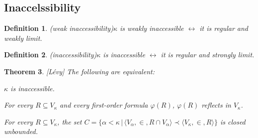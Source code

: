 \documentclass[12pt,a4paper]{article}
\newtheorem{theorem}{Theorem}[section]
\newtheorem{definition}[theorem]{Definition}
\newcommand{\set}[2]{\ensuremath{\{#1 \,|\, #2 \}}}
\renewcommand{\iff}{\leftrightarrow}
\newcommand{\el}{\prec}
\newcommand{\sub}{\subseteq}
\newcommand{\bce}{\begin{compactenum}}
\newcommand{\ece}{\end{compactenum}}
\begin{document}
\subsection{Inaccelssibility}
\begin{definition}(weak inaccessibility)\label{def:weakly_inaccessible}
$\kappa$ is \emph{weakly inaccessible} $\iff$ it is \emph{regular} and \emph{ weakly limit}.
\end{definition}
\begin{definition}(inaccessibility)\label{def:inaccessible}
$\kappa$ is \emph{inaccessible} $\iff$ it is \emph{regular} and \emph{strongly limit}.
\end{definition}
\begin{theorem}\label{th:refl_inaccessible}[Lévy] The following are equivalent:
\bce[(i)]
\item $\kappa$ is inaccessible.
\item For every $R \sub V_\kappa$ and every first-order formula $\varphi(R)$, $\varphi(R)$ reflects in $V_\kappa$.
\item For every $R \sub V_\kappa$, the set $C = \set{\alpha<\kappa}{\langle V_\alpha,\in,R \cap V_\alpha\rangle \el \langle V_\kappa,\in,R \rangle}$ is closed unbounded.
\ece
\end{theorem}
\end{document}
